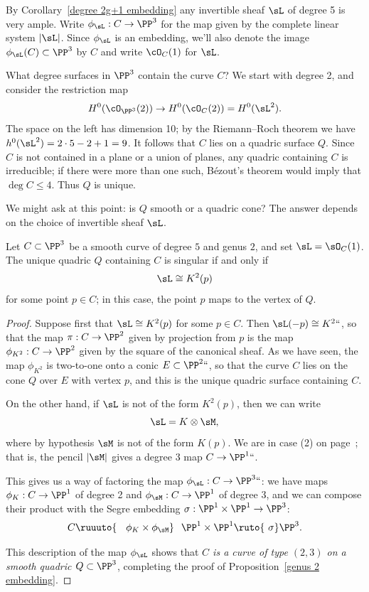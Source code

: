 By Corollary~\ref{degree 2g+1 embedding} any invertible sheaf $\sL$ of
%
%
degree 5 is very ample.
Write $\phi_\sL : C \to \PP^3$
for the map given by the complete linear
system $|\sL|$. Since $\phi_\sL$ is an embedding, we'll also denote the
image $\phi_\sL(C) \subset \PP^3$ by $C$ and write $\cO_C(1)$ for $\sL$.

What degree surfaces in $\PP^3$ contain the curve $C$? We start with
degree 2, and consider the restriction map
$$
H^0(\cO_{\PP^3}(2)) \to H^0(\cO_C(2)) = H^0(\sL^2).
$$
The space on the left has dimension 10; by the
Riemann--Roch theorem
%
we have $h^0(\sL^2) = 2\cdot5 - 2 + 1 = 9$. It follows that $C$ lies
on a quadric surface $Q$. Since $C$ is not contained in a plane or a
union of planes, any quadric containing $C$ is irreducible; if there
were more than one such,
B\'ezout's theorem
%
 would imply that $\deg C
\leq 4$. Thus $Q$ is unique.

We might ask at this point: is $Q$ smooth or a quadric cone? The answer
depends on the choice of invertible sheaf $\sL$.

\begin{proposition}
\label{genus 2 embedding}
Let $C \subset \PP^3$ be a smooth curve of degree $5$ and genus $2$, and
set $\sL = \sO_C(1)$. The unique quadric $Q$ containing $C$
  is singular if and only if
$$
\sL \cong K^2(p)
$$
for some point $p \in C$; in this case, the point $p$ maps to the vertex
of $Q$.
\end{proposition}

\begin{proof}

Suppose first that
$\sL \cong K^2(p)$ for some $p \in
C$. Then $\sL(-p) \cong K^2` `$, so that the map $\pi : C \to \PP^2$ given
by projection from $p$ is the map $\phi_{K^2} : C \to \PP^2$ given by
the square of the canonical sheaf. As we have seen, the map $\phi_{K^2}$
is two-to-one onto a conic $E \subset \PP^2` `$, so that the curve $C$
lies on the cone $Q$ over $E$ with vertex $p$, and this is the unique
quadric surface containing $C$.

On the other hand, if $\sL$ is not of the form $K^2(p)$, then we can write
$$
\sL = K \otimes \sM,
$$
where by hypothesis $\sM$ is not of the form $K(p)$.
We are in case (2) on page~\pageref{genus 2 pencil}; that is,
the pencil $|\sM|$ gives a
degree 3 map $C \to \PP^1` `$.

This gives us a way of factoring the map $\phi_\sL : C \to \PP^3` `$: we
have maps $\phi_K : C \to \PP^1$ of degree 2 and $\phi_\sM : C \to \PP^1$
of degree 3, and we can compose their product with the
Segre embedding
%
$\sigma : \PP^1 \times \PP^1 \to \PP^3$:
$$
C\ruuuto {\hskip0.9em\phi_K \times \phi_\sM}\hskip0.7em
\PP^1 \times \PP^1  \ruto {\ \sigma}  \PP^3.
$$

This description of the map $\phi_\sL$  shows  that \emph{$C$ is a
curve of type $(2,3)$
%
on a smooth quadric $Q \subset \PP^3$}, completing the
proof of Proposition~\ref{genus 2 embedding}.
\end{proof}

